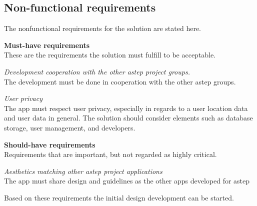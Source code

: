 \subsection{Non-functional requirements}
The nonfunctional requirements for the solution are stated here.

\textbf{Must-have requirements}\\
These are the requirements the solution must fulfill to be acceptable.

\textit{Development cooperation with the other \gls{astep} project groups.}\\
The development must be done in cooperation with the other \gls{astep} groups.

\textit{User privacy}\\
The app must respect user privacy, especially in regards to a user location data and user data in general.
The solution should consider elements such as database storage, user management, and developers.

\textbf{Should-have requirements}\\
Requirements that are important, but not regarded as highly critical.

\textit{Aesthetics matching other \gls{astep} project applications}\\
The app must share design and guidelines as the other apps developed for \gls{astep}

Based on these requirements the initial design development can be started.